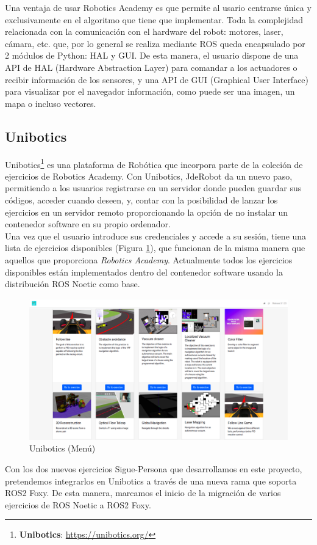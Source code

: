 Una ventaja de usar Robotics Academy es que permite al usario centrarse única y exclusivamente en el algoritmo que tiene que implementar. Toda la complejidad relacionada con la comunicación con el hardware del robot: motores, laser, cámara, etc. que, por lo general se realiza mediante ROS queda encapsulado por 2 módulos de Python: HAL y GUI. De esta manera, el usuario dispone de una API de HAL (Hardware Abstraction Layer) para comandar a los actuadores o recibir información de los sensores, y una API de GUI (Graphical User Interface) para visualizar por el navegador información, como puede ser una imagen, un mapa o incluso vectores.\\

\subsection{Unibotics}
\label{subsec:unibotics}

Unibotics\footnote{\textbf{Unibotics}: \url{https://unibotics.org/}} es una plataforma de Robótica que incorpora parte de la coleción de ejercicios de Robotics Academy. Con Unibotics, JdeRobot da un nuevo paso, permitiendo a los usuarios registrarse en un servidor donde pueden guardar sus códigos, acceder cuando deseen, y, contar con la posibilidad de lanzar los ejercicios en un servidor remoto proporcionando la opción de no instalar un contenedor software en su propio ordenador.\\

Una vez que el usuario introduce sus credenciales y accede a su sesión, tiene una lista de ejercicios disponibles (Figura \ref{fig:menu-unibotics}), que funcionan de la misma manera que aquellos que proporciona \textit{Robotics Academy}. Actualmente todos los ejercicios disponibles están implementados dentro del contenedor software usando la distribución ROS Noetic como base.\\

\begin{figure} [H]
  \begin{center}
    \includegraphics[width=12cm]{imagenes/cap1/unibotics-menu.png}
  \end{center}
  \caption[Unibotics (Menú)]{Unibotics (Menú)}
  \label{fig:menu-unibotics}
\end{figure}

Con los dos nuevos ejercicios Sigue-Persona que desarrollamos en este proyecto, pretendemos integrarlos en Unibotics a través de una nueva rama que soporta ROS2 Foxy. De esta manera, marcamos el inicio de la migración de varios ejercicios de ROS Noetic a ROS2 Foxy.\\




